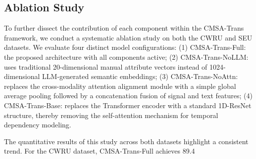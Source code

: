 \subsection{Ablation Study}
To further dissect the contribution of each component within the CMSA-Trans framework, we conduct a systematic ablation study on both the CWRU and SEU datasets. We evaluate four distinct model configurations: (1) CMSA-Trans-Full: the proposed architecture with all components active; (2) CMSA-Trans-NoLLM: uses traditional 20-dimensional manual attribute vectors instead of 1024-dimensional LLM-generated semantic embeddings; (3) CMSA-Trans-NoAttn: replaces the cross-modality attention alignment module with a simple global average pooling followed by a concatenation fusion of signal and text features; (4) CMSA-Trans-Base: replaces the Transformer encoder with a standard 1D-ResNet structure, thereby removing the self-attention mechanism for temporal dependency modeling.

The quantitative results of this study across both datasets highlight a consistent trend. For the CWRU dataset, CMSA-Trans-Full achieves 89.4%

